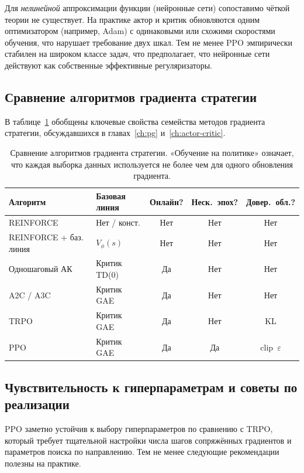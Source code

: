 Для \emph{нелинейной} аппроксимации функции (нейронные сети) сопоставимо чёткой теории не существует. На практике актор и критик обновляются одним оптимизатором (например, Adam) с одинаковыми или схожими скоростями обучения, что нарушает требование двух шкал. Тем не менее PPO эмпирически стабилен на широком классе задач, что предполагает, что нейронные сети действуют как собственные эффективные регуляризаторы.

\subsection{Сравнение алгоритмов градиента стратегии}

В таблице~\ref{tab:pg-comparison} обобщены ключевые свойства семейства методов градиента стратегии, обсуждавшихся в главах~\ref{ch:pg} и~\ref{ch:actor-critic}.

\begin{table}[ht]
\centering
\caption{Сравнение алгоритмов градиента стратегии. «Обучение на политике» означает, что каждая выборка данных используется не более чем для одного обновления градиента.}
\label{tab:pg-comparison}
\footnotesize
\begin{tabular}{@{}lp{2.2cm}ccc@{}}
\toprule
Алгоритм & Базовая линия & Онлайн? & Неск.\ эпох? & Довер.\ обл.? \\
\midrule
REINFORCE               & Нет / конст.  & Нет  & Нет  & Нет  \\
REINFORCE + баз. линия & $V_\phi(s)$      & Нет  & Нет  & Нет  \\
Одношаговый АК          & Критик TD(0)     & Да & Нет  & Нет  \\
A2C / A3C               & Критик GAE       & Да & Нет  & Нет  \\
TRPO                    & Критик GAE       & Да & Нет & KL \\
PPO                     & Критик GAE       & Да & Да & clip~$\varepsilon$ \\
\bottomrule
\end{tabular}
\end{table}

\subsection{Чувствительность к гиперпараметрам и советы по реализации}

PPO заметно устойчив к выбору гиперпараметров по сравнению с TRPO, который требует тщательной настройки числа шагов сопряжённых градиентов и параметров поиска по направлению. Тем не менее следующие рекомендации полезны на практике.

